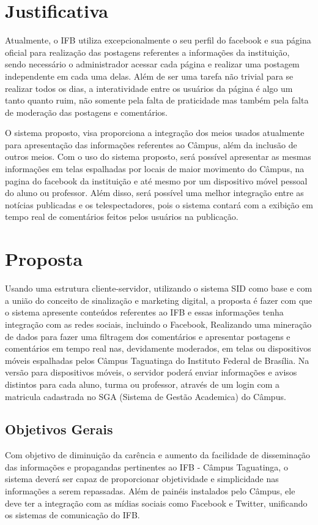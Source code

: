 \documentclass[
	12pt,				%
	openright,			%
	oneside,			%
	a4paper,			%
	english,			%
	french,				%
	spanish,			%
	brazil,				%
	]{abntex2}
\begin{document}
\section*{Justificativa}
	Atualmente, o IFB utiliza excepcionalmente o seu perfil do facebook e sua página oficial para realização das postagens referentes a informações da instituição, sendo necessário o administrador acessar cada página e realizar uma postagem independente em cada uma delas. Além de ser uma tarefa não trivial para se realizar todos os dias, a interatividade entre os usuários da página é algo um tanto quanto ruim, não somente pela falta de praticidade mas também pela falta de moderação das postagens e comentários.
	
	O sistema proposto, visa proporciona a integração dos meios usados atualmente para apresentação das informações referentes ao Câmpus, além da inclusão de outros meios. Com o uso do sistema proposto, será possível apresentar as mesmas informações em telas espalhadas por locais de maior movimento do Câmpus, na pagina do facebook da instituição e até mesmo por um dispositivo móvel pessoal do aluno ou professor. Além disso, será possível uma melhor integração entre as notícias publicadas e os telespectadores, pois o sistema contará com a exibição em tempo real de comentários feitos pelos usuários na publicação.
	
\section*{Proposta}
	Usando uma estrutura cliente-servidor, utilizando o sistema SID como base e com a união do conceito de sinalização e marketing digital, a proposta é fazer com que o sistema apresente conteúdos referentes ao IFB e essas informações tenha integração com as redes sociais, incluindo o Facebook, Realizando uma mineração de dados para fazer uma filtragem dos comentários e apresentar postagens e comentários em tempo real nas, devidamente moderados, em telas ou dispositivos móveis espalhadas pelos Câmpus Taguatinga do Instituto Federal de Brasília. Na versão para dispositivos móveis, o servidor poderá enviar informações e avisos distintos para cada aluno, turma ou professor, através de um login com a matricula cadastrada no SGA (Sistema de Gestão Academica) do Câmpus.
	
\subsection*{Objetivos Gerais}
	Com objetivo de diminuição da carência e aumento da facilidade de disseminação das informações e propagandas pertinentes ao IFB - Câmpus Taguatinga, o sistema deverá ser capaz de proporcionar objetividade e simplicidade nas informações a serem repassadas. Além de painéis instalados pelo Câmpus, ele deve ter a integração com as mídias sociais como Facebook e Twitter, unificando os sistemas de comunicação do IFB.
	
\end{document}
